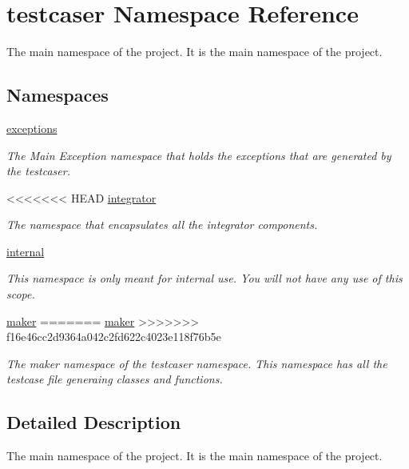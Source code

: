 \hypertarget{namespacetestcaser}{}\section{testcaser Namespace Reference}
\label{namespacetestcaser}


The main namespace of the project. It is the main namespace of the project.  


\subsection*{Namespaces}
\begin{DoxyCompactItemize}
\item 
 \hyperlink{namespacetestcaser_1_1exceptions}{exceptions}
\begin{DoxyCompactList}\small\item\em The Main Exception namespace that holds the exceptions that are generated by the testcaser. \end{DoxyCompactList}\item 
<<<<<<< HEAD
 \mbox{\hyperlink{namespacetestcaser_1_1integrator}{integrator}}
\begin{DoxyCompactList}\small\item\em The namespace that encapsulates all the integrator components. \end{DoxyCompactList}\item 
 \mbox{\hyperlink{namespacetestcaser_1_1internal}{internal}}
\begin{DoxyCompactList}\small\item\em This namespace is only meant for internal use. You will not have any use of this scope. \end{DoxyCompactList}\item 
 \mbox{\hyperlink{namespacetestcaser_1_1maker}{maker}}
=======
 \hyperlink{namespacetestcaser_1_1maker}{maker}
>>>>>>> f16e46cc2d9364a042c2fd622c4023e118f76b5e
\begin{DoxyCompactList}\small\item\em The maker namespace of the testcaser namespace. This namespace has all the testcase file generaing classes and functions. \end{DoxyCompactList}\end{DoxyCompactItemize}


\subsection{Detailed Description}
The main namespace of the project. It is the main namespace of the project. 

